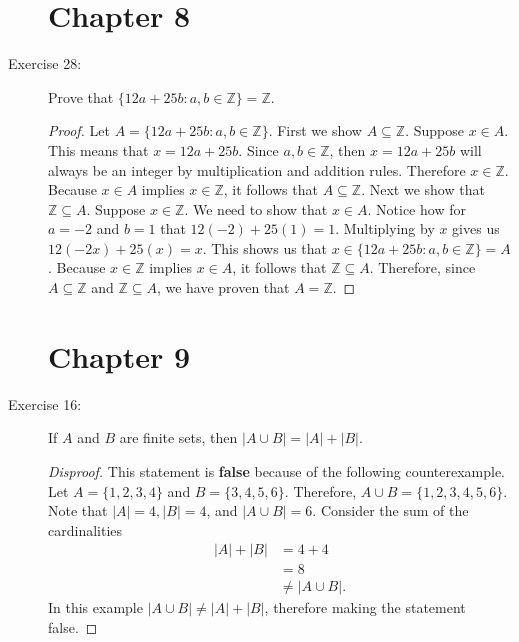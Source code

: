 \documentclass[12pt]{article}
\begin{document}
\begin{description}
\section*{Chapter 8}
\item[Exercise 28:] Prove that $\{12a+25b: a,b \in \mathbb{Z}\} = \mathbb{Z}$.

\begin{spacing}{2}
\begin{proof}
Let $A = \{12a+25b: a,b \in \mathbb{Z}\}$. First we show $A \subseteq \mathbb{Z}$. Suppose $x \in A$. This means that $x = 12a+25b$. Since $a,b \in \mathbb{Z}$, then $x=12a+25b$ will always be an integer by multiplication and addition rules. Therefore $x \in \mathbb{Z}$. Because $x \in A$ implies $x \in \mathbb{Z}$, it follows that $A \subseteq \mathbb{Z}$.
\newline
Next we show that $\mathbb{Z} \subseteq A$. Suppose $x \in \mathbb{Z}$. We need to show that $x \in A$. Notice how for $a=-2$ and $b=1$ that $12(-2) + 25(1) = 1$. Multiplying by $x$ gives us $12(-2x) + 25(x) = x$. This shows us that $x \in \{12a+25b: a,b \in \mathbb{Z}\} = A$. Because $x \in \mathbb{Z}$ implies $x \in A$, it follows that $\mathbb{Z} \subseteq A$.
\newline
Therefore, since $A \subseteq \mathbb{Z}$ and $\mathbb{Z} \subseteq A$, we have proven that $A = \mathbb{Z}$.
\end{proof}
\end{spacing} 
\section*{Chapter 9}
\item[Exercise 16:] If $A$ and $B$ are finite sets, then $|A \cup B| = |A| + |B|$.
\begin{spacing}{2}
\begin{proof}[Disproof]
This statement is \textbf{false} because of the following counterexample.
\newline
Let $A = \{1,2,3,4\}$ and $B = \{3,4,5,6\}$. Therefore, $A \cup B = \{1,2, 3,4,5,6\}$. Note that $|A| = 4, |B| = 4$, and $|A \cup B| = 6$. Consider the sum of the cardinalities
\begin{align*}
|A| + |B| &= 4 + 4 \\
&= 8 \\ 
&\neq |A \cup B|.
\end{align*}
In this example $|A \cup B| \neq |A| + |B|$, therefore making the statement false.
\end{proof}
\end{spacing} 
\end{description}
%
\newpage
{}
%
\end{document}
